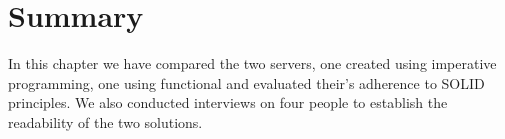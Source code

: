 \section{Summary}\label{resultsummary}

In this chapter we have compared the two servers, one created using imperative
programming, one using functional and evaluated their's adherence to SOLID
principles. We also conducted interviews on four people to establish the
readability of the two solutions. 
